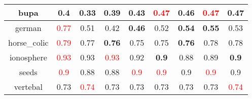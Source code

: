 \documentclass{article}%
\begin{document}
\begin{tabular}{c|cccccccc}
\hline%
bupa&\textbf{0.4}&0.33&0.39&\textbf{0.43}&\textcolor{red}{ 
0.47
}&0.46&\textcolor{red}{ 
0.47
}&0.47\\%
\hline%
german&\textcolor{red}{ 
0.77
}&0.51&0.42&\textbf{0.46}&0.52&\textbf{0.54}&\textbf{0.55}&0.53\\%
\hline%
horse\_colic&\textcolor{red}{ 
0.79
}&0.77&\textbf{0.76}&0.75&0.75&\textbf{0.76}&0.78&0.78\\%
\hline%
ionosphere&\textcolor{red}{ 
0.93
}&0.93&\textcolor{red}{ 
0.93
}&0.92&\textbf{0.9}&0.88&0.89&\textbf{0.9}\\%
\hline%
seeds&\textcolor{red}{ 
0.9
}&0.88&0.88&\textcolor{red}{ 
0.9
}&\textcolor{red}{ 
0.9
}&0.9&\textcolor{red}{ 
0.9
}&0.9\\%
\hline%
vertebal&0.73&\textcolor{red}{ 
0.74
}&0.73&0.73&0.73&0.73&0.73&\textcolor{red}{ 
0.74
}\\%
\hline%
\end{tabular}

%
\end{document}
